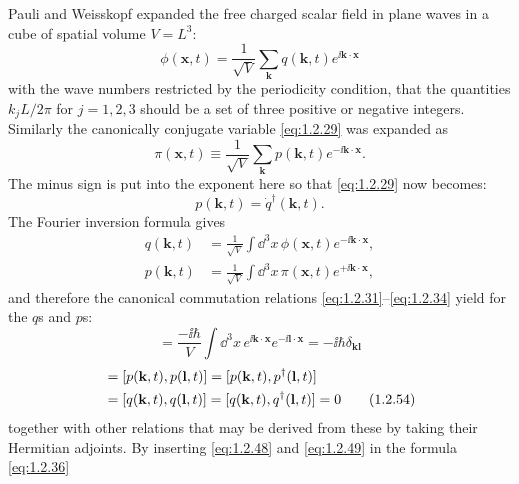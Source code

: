 Pauli and Weisskopf expanded the free charged scalar field in plane waves in
a cube of spatial volume $V=L^3$:
\begin{equation}
  \phi(\mathbf x,t)=\frac{1}{\sqrt V}\sum_{\mathbf k}
    q(\mathbf k,t)e^{\ii\mathbf k\cdot\mathbf x}
  \tag{1.2.48}\label{eq:1.2.48}
\end{equation}
with the wave numbers restricted by the periodicity condition, that the
quantities $k_jL/2\pi$ for $j=1,2,3$ should be a set of three positive or
negative integers. Similarly the canonically conjugate variable \eqref{eq:1.2.29} was
expanded as
\begin{equation}
  \pi(\mathbf x,t)\equiv\frac{1}{\sqrt V}\sum_{\mathbf k}
    p(\mathbf k,t)e^{-\ii\mathbf k\cdot\mathbf x}.
  \tag{1.2.49}\label{eq:1.2.49}
\end{equation}
The minus sign is put into the exponent here so that \eqref{eq:1.2.29} now becomes:
\begin{equation}
  p(\mathbf k,t)=\dot q^{\dagger}(\mathbf k,t).
  \tag{1.2.50}\label{eq:1.2.50}
\end{equation}
The Fourier inversion formula gives
\begin{align}
  q(\mathbf k,t)&=\frac{1}{\sqrt V}\int \dd^3x\,
    \phi(\mathbf x,t)e^{-\ii\mathbf k\cdot\mathbf x},
  \tag{1.2.51}\label{eq:1.2.51}\\
  p(\mathbf k,t)&=\frac{1}{\sqrt V}\int \dd^3x\,
    \pi(\mathbf x,t)e^{+\ii\mathbf k\cdot\mathbf x},
  \tag{1.2.52}\label{eq:1.2.52}
\end{align}
and therefore the canonical commutation relations \eqref{eq:1.2.31}--\eqref{eq:1.2.34} yield
for the $q$s and $p$s:
\begin{equation}
  [p(\mathbf k,t),q(\mathbf l,t)]
  =\frac{-\ii\hbar}{V}\int \dd^3x\,
    e^{\ii\mathbf k\cdot\mathbf x}e^{-\ii\mathbf l\cdot\mathbf x}
  =-\ii\hbar\delta_{\mathbf k\mathbf l}
  \tag{1.2.53}\label{eq:1.2.53}
\end{equation}
\begin{align}
  [p(\mathbf k,t),q^{\dagger}(\mathbf l,t)]
  &=[p(\mathbf k,t),p(\mathbf l,t)]
   =[p(\mathbf k,t),p^{\dagger}(\mathbf l,t)]
  \notag\\
  &=[q(\mathbf k,t),q(\mathbf l,t)]
   =[q(\mathbf k,t),q^{\dagger}(\mathbf l,t)]=0
  \tag{1.2.54}\label{eq:1.2.54}
\end{align}
together with other relations that may be derived from these by taking their
Hermitian adjoints. By inserting \eqref{eq:1.2.48} and \eqref{eq:1.2.49} in the formula \eqref{eq:1.2.36}
